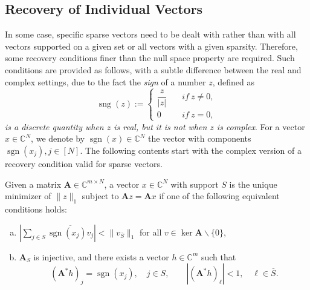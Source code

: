 \subsection{Recovery of Individual Vectors}
In some case, specific sparse vectors need to be dealt with rather than with all vectors supported on a given set or all vectors with a given sparsity. Therefore, some recovery conditions finer than the null space property are required. Such conditions are provided as follows, with a subtle difference between the real and complex settings, due to the fact the \emph{sign} of a number $z$, defined as
\begin{equation*}
    \mathop{\mathrm{sng}}(z) :=
    \left\{ 
        \begin{array}{cc}
            \dfrac{z}{\left|z\right|} \quad & if \ z\neq 0, \\
            0 \quad & if \ z=0,
        \end{array}
    \right.
\end{equation*}
\emph{\textcolor[rgb]{1,0,0}{is a discrete quantity when $z$ is real, but it is not when $z$ is complex}}. For a vector $x \in \mathbb{C}^N$, we denote by $\mathop{\mathrm{sgn}}(x) \in \mathbb{C}^N$ the vector with components $\mathop{\mathrm{sgn}}(x_j), j \in [N]$. The following contents start with the complex version of a recovery condition valid for sparse vectors.
\begin{theorem}
    \label{th0.4.26}
    Given a matrix $\mathbf{A} \in \mathbb{C}^{m \times N}$, a vector $x \in \mathbb{C}^N$ with support $S$ is the unique minimizer of $\|z\|_1$ subject to $\mathbf{A}z = \mathbf{A}x$ if one of the following equivalent conditions holds:
    \begin{enumerate}[(a)]
        \item $\left|\sum\limits_{j \in S}^{} \overline{\mathop{\mathrm{sgn}}(x_j)v_j}\right| < \|v_{\overline{S}}\|_1$ for all $v \in \mathop{\mathrm{ker}} \mathbf{A} \backslash \{0\}$,
        \item $\mathbf{A}_S$ is injective, and there exists a vector $h \in \mathbb{C}^m$ such that
            \[
                (\mathbf{A}^*h)_j = \mathop{\mathrm{sgn}}(x_j), \quad j \in S, \qquad \left|(\mathbf{A}^*h)_{\ell}\right| < 1, \quad \ell \in \overline{S}.
            \]
    \end{enumerate}
\end{theorem}
